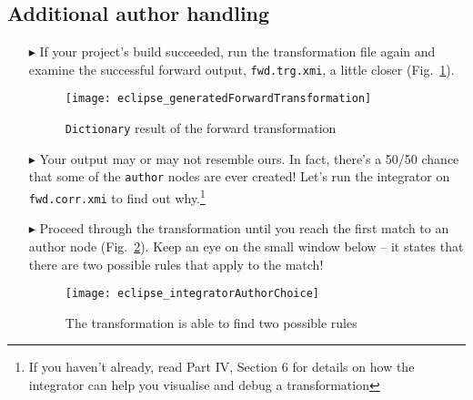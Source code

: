 \newpage
\hypertarget{t2m close}{}
\subsection{Additional author handling}
\genHeader

\begin{itemize}

\item[$\blacktriangleright$] If your project's build succeeded, run the transformation file again and examine the successful forward output, 
\texttt{fwd.trg.xmi}, a little closer (Fig.~\ref{eclipse:generatedFwdTrsfm}).

\vspace{0.5cm}

\begin{figure}[htbp]
\begin{center}
  \texttt{[image: eclipse\_generatedForwardTransformation]}
  \caption{\texttt{Dictionary} result of the forward transformation}
  \label{eclipse:generatedFwdTrsfm}
\end{center}
\end{figure}

\vspace{0.5cm}

\item[$\blacktriangleright$] Your output may or may not resemble ours. In fact, there's a 50/50 chance that some of the \texttt{author} nodes are ever created!
Let's run the integrator on \texttt{fwd.corr.xmi} to find out why.\footnote{If you haven't already, read Part IV, Section 6 for details on how the
integrator can help you visualise and debug a transformation}

\vspace{0.5cm}

\item[$\blacktriangleright$] Proceed through the transformation until you reach the first match to an author node (Fig.~\ref{eclipse:fwdIntegrator}). Keep an
eye on the small window below -- it states that there are two possible rules that apply to the match!

\begin{figure}[htbp]
\begin{center}
  \texttt{[image: eclipse\_integratorAuthorChoice]}
  \caption{The transformation is able to find two possible rules}
  \label{eclipse:fwdIntegrator}
\end{center}
\end{figure}


\end{itemize}
